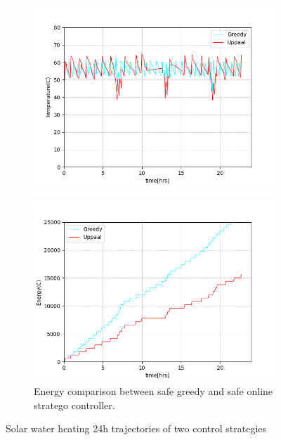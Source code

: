         \begin{figure}[!htb]        
          \begin{subfigure}{0.51\textwidth}
            \includegraphics[width=1.0\linewidth]{images/controllers1.png}
            \captionsetup{format=hang}
             \label{fig:resulta}
          \end{subfigure}
          \hspace*{\fill}
          \begin{subfigure}{0.51\textwidth}
              \includegraphics[width=1.0\linewidth]{images/energycomparison.png}
              \captionsetup{format=hang}
              \caption{Energy comparison between safe greedy and safe online stratego
              controller.} \label{fig:resultb}
          \end{subfigure}%
          \caption{Solar water heating 24h trajectories of two control strategies}
        \end{figure}

